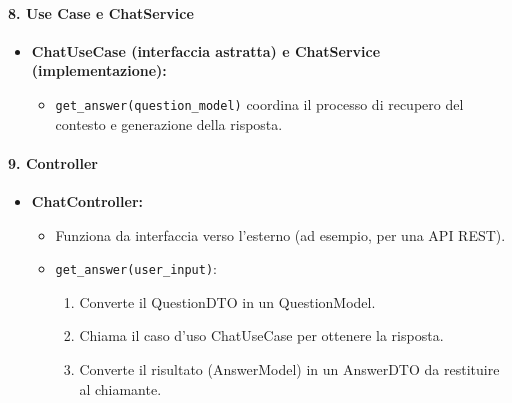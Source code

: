 \paragraph{8. Use Case e ChatService}
\begin{itemize}
    \item \textbf{ChatUseCase (interfaccia astratta) e ChatService (implementazione):}
    \begin{itemize}
        \item \texttt{get\_answer(question\_model)} coordina il processo di recupero del contesto e generazione della risposta.
    \end{itemize}
\end{itemize}

\paragraph{9. Controller}
\begin{itemize}
    \item \textbf{ChatController:}
    \begin{itemize}
        \item Funziona da interfaccia verso l’esterno (ad esempio, per una API REST).
        \item \texttt{get\_answer(user\_input)}:
        \begin{enumerate}
            \item Converte il QuestionDTO in un QuestionModel.
            \item Chiama il caso d’uso ChatUseCase per ottenere la risposta.
            \item Converte il risultato (AnswerModel) in un AnswerDTO da restituire al chiamante.
        \end{enumerate}
    \end{itemize}
\end{itemize}










